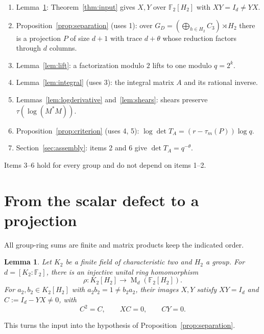 \documentclass[11pt]{article}
\newtheorem{lemma}[theorem]{Lemma}
\theoremstyle{remark}
\numberwithin{equation}{section}
\newcommand{\F}{\mathbb F}
\newcommand{\Mat}{\operatorname{M}}
\begin{document}
\begin{enumerate}[label=\arabic*.,itemsep=1pt,topsep=3pt]
\item Lemma~\ref{lem:binary}: Theorem~\ref{thm:input} gives $X,Y$ over $\F_2[H_2]$ with $XY=I_d\ne YX$.
\item Proposition~\ref{prop:separation} (uses 1): over $G_D=(\bigoplus_{h\in H_2}C_3)\rtimes H_2$ there is a projection $P$ of size $d+1$ with trace $d+\theta$ whose reduction factors through $d$ columns.
\item Lemma~\ref{lem:lift}: a factorization modulo $2$ lifts to one modulo $q=2^k$.
\item Lemma~\ref{lem:integral} (uses 3): the integral matrix $A$ and its rational inverse.
\item Lemmas~\ref{lem:logderivative} and~\ref{lem:shears}: shears preserve $\tau(\log(M^*M))$.
\item Proposition~\ref{prop:criterion} (uses 4, 5): $\log\det T_A=(r-\tau_m(P))\log q$.
\item Section~\ref{sec:assembly}: items 2 and 6 give $\det T_A=q^{-\theta}$.
\end{enumerate}
Items 3--6 hold for every group and do not depend on items 1--2.

\section{From the scalar defect to a projection}
\label{sec:projection}

All group-ring sums are finite and matrix products keep the indicated order.

\begin{lemma}\label{lem:binary}
Let $K_2$ be a finite field of characteristic two and $H_2$ a group. For $d=[K_2:\F_2]$, there is an injective unital ring homomorphism
\[
 \rho:K_2[H_2]\longrightarrow\Mat_d(\F_2[H_2]).
\]
For $a_2,b_2\in K_2[H_2]$ with $a_2b_2=1\ne b_2a_2$, their images $X,Y$ satisfy $XY=I_d$ and $C:=I_d-YX\ne0$, with
\begin{equation}\label{eq:defect}
 C^2=C,\qquad XC=0,\qquad CY=0.
\end{equation}
\end{lemma}

This turns the input into the hypothesis of Proposition~\ref{prop:separation}.
\end{document}
